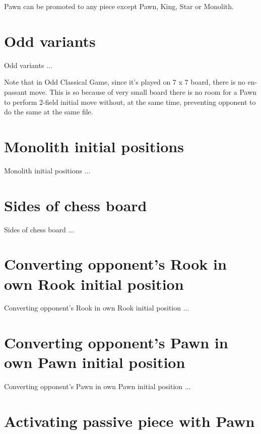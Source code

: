 Pawn can be promoted to any piece except Pawn, King, Star or Monolith.

\section*{Odd variants}

Odd variants ...

Note that in Odd Classical Game, since it's played on 7 x 7 board,
there is no en-passant move. This is so because of very small board
there is no room for a Pawn to perform 2-field initial move without,
at the same time, preventing opponent to do the same at the same file.

\section*{Monolith initial positions}

Monolith initial positions ...

\section*{Sides of chess board}

Sides of chess board ...

\section*{Converting opponent's Rook in own Rook initial position}

Converting opponent's Rook in own Rook initial position ...

\section*{Converting opponent's Pawn in own Pawn initial position}

Converting opponent's Pawn in own Pawn initial position ...

\section*{Activating passive piece with Pawn}

